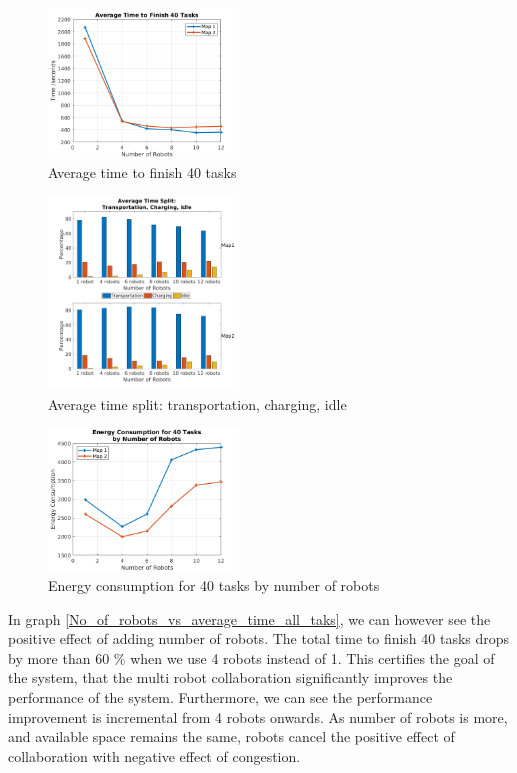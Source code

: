 \documentclass[journal]{IEEEtran}
\begin{document}
\begin{figure}[h]
	\centering
	\includegraphics[width=0.45\textwidth]{resources/Graphs-paper/graph6.png}
	\caption{Average time to finish 40 tasks}
	\label{fig:time_to_finish_40_tasks}
\end{figure}

\begin{figure}[h]
	\centering
	\includegraphics[width=0.45\textwidth]{resources/Graphs-paper/graph7.png}
	\caption{Average time split: transportation, charging, idle}
	\label{fig:trans_charg_idle}
\end{figure}

\begin{figure}[h]
	\centering
	\includegraphics[width=0.45\textwidth]{resources/Graphs-paper/graph8.png}
	\caption{Energy consumption for 40 tasks by number of robots}
	\label{fig:energy_consumption}
\end{figure}


In graph \ref{No_of_robots_vs_average_time_all_taks}, we can however see the positive effect of adding number of robots. The total time to finish 40 tasks drops by more than 60 \% when we use 4 robots instead of 1. This certifies the goal of the system, that the multi robot collaboration significantly improves the performance of the system. Furthermore, we can see the performance improvement is incremental from 4 robots onwards. As number of robots is more, and available space remains the same, robots cancel the positive effect of collaboration with negative effect of congestion.
\end{document}
